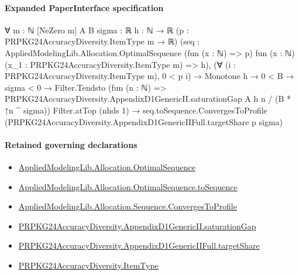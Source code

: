 \documentclass[10pt]{article}
\begin{document}
\paragraph{Expanded PaperInterface specification}
\begin{ReviewVerbatim}
∀ {m : ℕ} [NeZero m] {A B sigma : ℝ} {h : ℕ → ℝ} (p : PRPKG24AccuracyDiversity.ItemType m → ℝ)
  (seq :
    AppliedModelingLib.Allocation.OptimalSequence (fun (x : ℕ) => p)
      fun (x : ℕ) (x_1 : PRPKG24AccuracyDiversity.ItemType m) => h),
  (∀ (i : PRPKG24AccuracyDiversity.ItemType m), 0 < p i) →
    Monotone h →
      0 < B →
        sigma < 0 →
          Filter.Tendsto
              (fun (n : ℕ) => PRPKG24AccuracyDiversity.AppendixD1GenericII.saturationGap A h n / (B * ↑n ^ sigma))
              Filter.atTop (nhds 1) →
            seq.toSequence.ConvergesToProfile (PRPKG24AccuracyDiversity.AppendixD1GenericIIFull.targetShare p sigma)
\end{ReviewVerbatim}

\paragraph{Retained governing declarations}
\begin{itemize}\raggedright
\item \hyperlink{governing-declaration-de3def91e8620291}{Applied\allowbreak{}Modeling\allowbreak{}Lib.\allowbreak{}Allocation.\allowbreak{}Optimal\allowbreak{}Sequence}
\item \hyperlink{governing-declaration-7a4a864147660f7c}{Applied\allowbreak{}Modeling\allowbreak{}Lib.\allowbreak{}Allocation.\allowbreak{}Optimal\allowbreak{}Sequence.\allowbreak{}to\allowbreak{}Sequence}
\item \hyperlink{governing-declaration-ec09422b2ba8f633}{Applied\allowbreak{}Modeling\allowbreak{}Lib.\allowbreak{}Allocation.\allowbreak{}Sequence.\allowbreak{}Converges\allowbreak{}To\allowbreak{}Profile}
\item \hyperlink{governing-declaration-b2b5d2c4173cf9ab}{PRPKG24\allowbreak{}Accuracy\allowbreak{}Diversity.\allowbreak{}Appendix\allowbreak{}D1\allowbreak{}Generic\allowbreak{}II.\allowbreak{}saturation\allowbreak{}Gap}
\item \hyperlink{governing-declaration-ef281feaf0ce3a24}{PRPKG24\allowbreak{}Accuracy\allowbreak{}Diversity.\allowbreak{}Appendix\allowbreak{}D1\allowbreak{}Generic\allowbreak{}II\allowbreak{}Full.\allowbreak{}target\allowbreak{}Share}
\item \hyperlink{governing-declaration-562ef32e180a12be}{PRPKG24\allowbreak{}Accuracy\allowbreak{}Diversity.\allowbreak{}Item\allowbreak{}Type}
\end{itemize}
\end{document}
